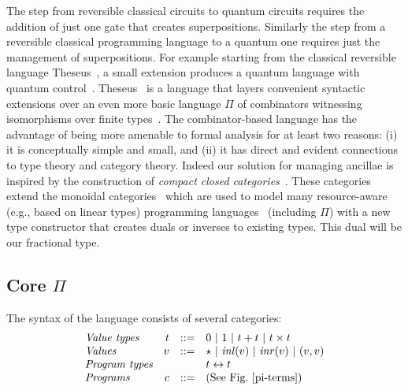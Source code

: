 \documentclass[sigplan,10pt,review,anonymous]{acmart}
\newcommand{\alt}{~|~}
\newcommand{\inlv}[1]{\ensuremath{\mathit{inl}(v)}}
\newcommand{\inrv}[1]{\ensuremath{\mathit{inr}(v)}}
\begin{document}
The step from reversible classical circuits to quantum circuits
requires the addition of just one gate that creates
superpositions. Similarly the step from a reversible classical
programming language to a quantum one requires just the management of
superpositions. For example starting from the classical reversible
language Theseus~\cite{james2014theseus}, a small extension produces a
quantum language with quantum
control~\cite{10.1007/978-3-319-89366-2_19}.
Theseus~\cite{james2014theseus} is a language that layers convenient
syntactic extensions over an even more basic language $\Pi$ of
combinators witnessing isomorphisms over finite
types~\cite{DBLP:conf/esop/CaretteS16}. The combinator-based language
has the advantage of being more amenable to formal analysis for at
least two reasons: (i) it is conceptually simple and small, and (ii)
it has direct and evident connections to type theory and category
theory. Indeed our solution for managing ancillae is inspired by the
construction of \emph{compact closed
  categories}~\cite{kelly1972many}. These categories extend the
monoidal
categories~\cite{benabou1963algebre,benabou1964algebre,maclane1963natural} which
are used to model many resource-aware (e.g., based on linear types) programming
languages~\cite{benton1994mixed,krishnaswami2015integrating}
(including $\Pi$) with a new type
constructor that creates duals or inverses to existing types. This
dual will be our fractional type.

\subsection{Core $\Pi$}
\label{sub:core}

The syntax of the language consists of several categories:
\[\begin{array}{lrcl}
\textit{Value types} & t &::=& 0 \alt 1 \alt t+t \alt t\times t \\
\textit{Values}      & v &::=& \star \alt \inlv{v} \alt \inrv{v} \alt (v,v) \\
\textit{Program types} &&& t \leftrightarrow t \\
\textit{Programs} & c &::=& (\textrm{See Fig.~\ref{pi-terms}})
\end{array}\]
\end{document}
